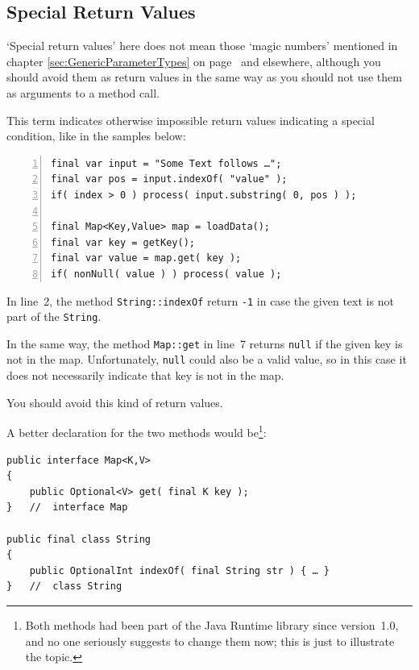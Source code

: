 \documentclass[11pt,a4paper, titlepage, parskip=half, headsepline, footsepline, cleardoublepage=current, headheight=1cm]{scrbook}
\newcommand*{\tqvref}[1]{\hyperref[{#1}]{\ref*{#1}} on page~\pageref{#1}}
\begin{document}

\subsection{Special Return Values}\label{sec:SpecialReturnValues}
‘Special return values’ here does not mean those ‘magic numbers’ mentioned in chapter \tqvref{sec:GenericParameterTypes} and elsewhere, although you should avoid them as return values in the same way as you should not use them as arguments to a method call.

This term indicates otherwise impossible return values indicating a special condition, like in the samples below:
\begin{lstlisting}[numbers=left]
final var input = "Some Text follows …";
final var pos = input.indexOf( "value" );
if( index > 0 ) process( input.substring( 0, pos ) );

final Map<Key,Value> map = loadData();
final var key = getKey();
final var value = map.get( key );
if( nonNull( value ) ) process( value );
\end{lstlisting}
In line~2, the method \lstinline|String::indexOf|\autocite{ORACLE_DOC_STRING:indexOf} return \verb#-1# in case the given text is not part of the \lstinline|String|.

In the same way, the method \lstinline|Map::get|\autocite{ORACLE_DOC_MAP:get} in line~7 returns \lstinline|null| if the given key is not in the map. Unfortunately, \lstinline|null| could also be a valid value, so in this case it does not necessarily indicate that key is not in the map.

You should avoid this kind of return values.

A better declaration for the two methods would be\footnote{Both methods had been part of the Java Runtime library since version~1.0, and no one seriously suggests to change them now; this is just to illustrate the topic.}:
\begin{lstlisting}
public interface Map<K,V>
{
    public Optional<V> get( final K key );
}   //  interface Map

public final class String
{
    public OptionalInt indexOf( final String str ) { … }
}   //  class String
\end{lstlisting}
\end{document}
